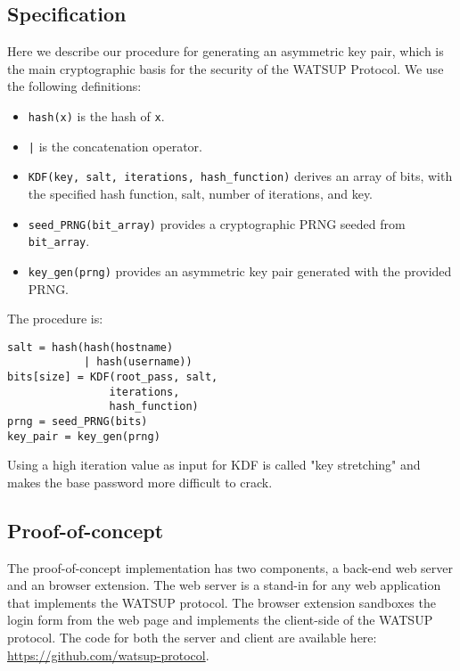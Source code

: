 \subsection{Specification}

Here we describe our procedure for generating an asymmetric key pair, which is the main cryptographic basis for the security of the WATSUP Protocol. We use the following definitions:

\begin{itemize}

    \item \texttt{hash(x)} is the hash of \texttt{x}.

    \item \texttt{|} is the concatenation operator.

    \item \texttt{KDF(key, salt, iterations, hash\_function)} derives an array of bits, with the specified hash function, salt, number of iterations, and key.

    \item \texttt{seed\_PRNG(bit\_array)} provides a cryptographic PRNG seeded from \texttt{bit\_array}.

    \item \texttt{key\_gen(prng)} provides an asymmetric key pair generated with the provided PRNG.

\end{itemize}

\pagebreak
\noindent The procedure is:

\begin{verbatim}
salt = hash(hash(hostname)
            | hash(username))
bits[size] = KDF(root_pass, salt,
                iterations,
                hash_function)
prng = seed_PRNG(bits)
key_pair = key_gen(prng)
\end{verbatim}

Using a high iteration value as input for KDF is called "key stretching" and makes the base password more difficult to crack.

\subsection{Proof-of-concept}

The proof-of-concept implementation has two components, a back-end web server and an browser extension. The web server is a stand-in for any web application that implements the WATSUP protocol. The browser extension sandboxes the login form from the web page and implements the client-side of the WATSUP protocol. The code for both the server and client are available here: \url{https://github.com/watsup-protocol}.

